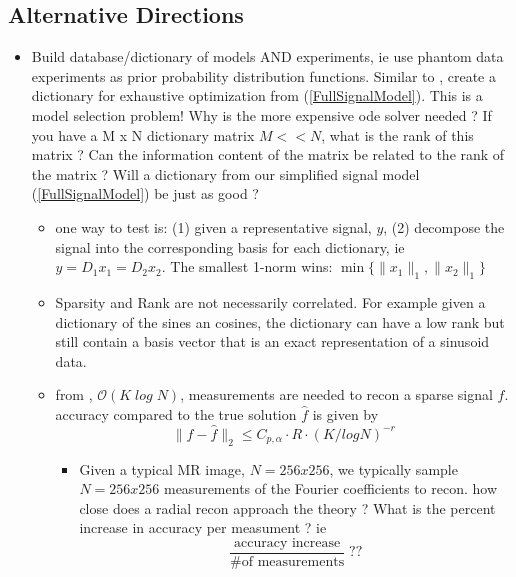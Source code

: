 \documentclass[10pt]{amsart}
\newcommand{\eqn}[1]{(\ref{#1})}
\begin{document}
\subsection{Alternative Directions }

  \begin{itemize}
     \item {\color{red} Build database/dictionary of models AND experiments, ie use
phantom data  experiments as prior probability distribution functions.
Similar to \cite{Ma2013}, create a dictionary for exhaustive optimization
from \eqn{FullSignalModel}. This is a model selection problem! Why is the
more expensive ode solver needed ? If you have a M x N dictionary matrix $M << N$,  what
is the rank of this matrix ?  Can the information content of the matrix be
related to the rank of the matrix ? Will a dictionary from our simplified
signal model \eqn{FullSignalModel} be just as good ?  }
  \begin{itemize}
     \item one way to test is: (1) given a representative signal, $y$,
          (2) decompose the signal into the corresponding basis for each
              dictionary,  ie $ y = D_1 x_1 = D_2 x_2 $. The smallest 1-norm
              wins: $\min\{\|x_1\|_1,\|x_2\|_1\}$
     \item  Sparsity and Rank are not necessarily correlated. For example
            given a dictionary of the sines an cosines, the dictionary can
            have a low rank but still contain a basis vector that is an
            exact representation of a sinusoid data.
     \item from \cite{Candes2006a}, $\mathcal{O}(K \; log \; N)$, measurements
           are needed  to recon a sparse signal $f$. accuracy compared to
           the true solution $\hat{f}$ is given by
         \[
           \|f - \hat{f}\|_2 \leq C_{p,\alpha} \cdot R \cdot (  K/ logN )^{-r}
         \]
      \begin{itemize}
        \item  Given a typical MR image, $N=256x256$, we typically sample $N=256x256$ measurements
               of the Fourier coefficients to recon. how close does a radial
               recon approach the theory ?  What is the percent increase in
               accuracy per measument ?  ie
                \[
                         \frac{\text{accuracy increase}}{\text{\# of measurements}} \; ?? 
\]
\end{itemize}
\end{itemize}
\end{itemize}
\end{document}
